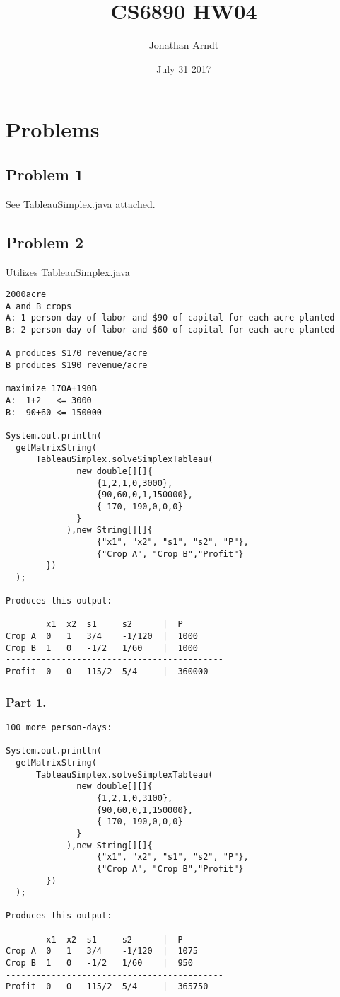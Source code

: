 \documentclass[11pt,a4paper,openany]{report}
\title{CS6890 HW04}
\author{Jonathan Arndt }
\date{July 31 2017}
\begin{document}
\maketitle

\tableofcontents
\newpage
\section{Problems}
\subsection{Problem 1}
See TableauSimplex.java attached.

\subsection{Problem 2}
Utilizes TableauSimplex.java
\begin{verbatim}
2000acre
A and B crops
A: 1 person-day of labor and $90 of capital for each acre planted
B: 2 person-day of labor and $60 of capital for each acre planted

A produces $170 revenue/acre
B produces $190 revenue/acre

maximize 170A+190B
A:  1+2   <= 3000
B:  90+60 <= 150000

System.out.println(
  getMatrixString(
      TableauSimplex.solveSimplexTableau(
              new double[][]{
                  {1,2,1,0,3000},
                  {90,60,0,1,150000},
                  {-170,-190,0,0,0}
              }
            ),new String[][]{
                  {"x1", "x2", "s1", "s2", "P"},
                  {"Crop A", "Crop B","Profit"}
        })
  );

Produces this output:

        x1  x2  s1     s2      |  P
Crop A  0   1   3/4    -1/120  |  1000
Crop B  1   0   -1/2   1/60    |  1000
-------------------------------------------
Profit  0   0   115/2  5/4     |  360000

\end{verbatim}
\subsubsection{Part 1.}
\begin{verbatim}
100 more person-days:

System.out.println(
  getMatrixString(
      TableauSimplex.solveSimplexTableau(
              new double[][]{
                  {1,2,1,0,3100},
                  {90,60,0,1,150000},
                  {-170,-190,0,0,0}
              }
            ),new String[][]{
                  {"x1", "x2", "s1", "s2", "P"},
                  {"Crop A", "Crop B","Profit"}
        })
  );

Produces this output:

        x1  x2  s1     s2      |  P
Crop A  0   1   3/4    -1/120  |  1075
Crop B  1   0   -1/2   1/60    |  950
-------------------------------------------
Profit  0   0   115/2  5/4     |  365750
\end{verbatim}
\end{document}

